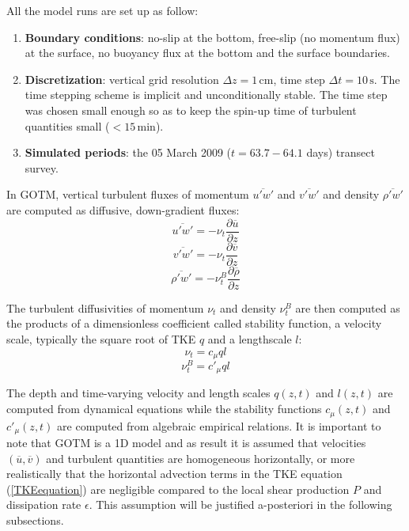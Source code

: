 All the model runs are set up as follow:
\begin{enumerate}
\item \textbf{Boundary conditions}: no-slip at the bottom, free-slip (no momentum flux) at the surface, no buoyancy flux at the bottom and the surface boundaries.
\item \textbf{Discretization}: vertical grid resolution $\Delta z = 1\,\mathrm{cm}$, time step $\Delta t = 10\,\mathrm{s}$. The time stepping scheme is implicit and unconditionally stable. The time step was chosen small enough so as to keep the spin-up time of turbulent quantities small ($<15\,\mathrm{min}$).
\item \textbf{Simulated periods}: the 05 March 2009 ($t=63.7-64.1$ days) transect survey.
\end{enumerate}

In GOTM, vertical turbulent fluxes of momentum $\overline{u'w'}$ and $\overline{v'w'}$ and density $\overline{\rho' w'}$ are computed as diffusive, down-gradient fluxes:
\begin{equation}
\label{gotmReynoldsStressUW}
\overline{u'w'} = - \nu_t \frac{\partial \overline{u}}{\partial z}
\end{equation}
\begin{equation}
\label{gotmReynoldsStressVW}
\overline{v'w'} = - \nu_t \frac{\partial \overline{v}}{\partial z}
\end{equation}
\begin{equation}
\label{gotmReynoldsStressRHOW}
\overline{\rho' w'} = - \nu_t^B \frac{\partial \overline{\rho}}{\partial z}
\end{equation}

The turbulent diffusivities of momentum $\nu_t$ and density $\nu_t^B$ are then computed as the products of a dimensionless coefficient called stability function, a velocity scale, typically the square root of TKE $q$ and a lengthscale $l$:
\begin{equation}
\nu_t = c_{\mu} q l
\end{equation}
\begin{equation}
 \nu_t^B = c'_{\mu} q l
 \end{equation}

The depth and time-varying velocity and length scales $q(z,t)$ and $l(z,t)$ are computed from dynamical equations while the stability functions $c_{\mu}(z,t)$ and $c'_\mu(z,t)$ are computed from algebraic empirical relations. It is important to note that GOTM is a 1D model and as result it is assumed that velocities $(\overline{u}, \overline{v})$ and turbulent quantities are homogeneous horizontally, or more realistically that the horizontal advection terms in the TKE equation (\ref{TKEequation}) are negligible compared to the local shear production $P$ and dissipation rate $\epsilon$. This assumption will be justified a-posteriori in the following subsections.

